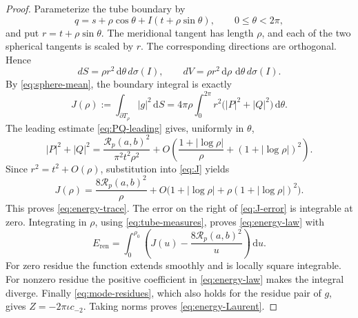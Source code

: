 \documentclass[11pt,a4paper]{article}
\numberwithin{equation}{section}
\theoremstyle{definition}
\theoremstyle{remark}
\newcommand{\dd}{\,\mathrm d}
\begin{document}
\begin{proof}
Parameterize the tube boundary by
\[
 q=s+\rho\cos\theta+I(t+\rho\sin\theta),
 \qquad 0\le\theta<2\pi,
\]
and put $r=t+\rho\sin\theta$. The meridional tangent has length
$\rho$, and each of the two spherical tangents is scaled by $r$.
The corresponding directions are orthogonal. Hence
\begin{equation}
 dS=\rho r^2\dd\theta\,d\sigma(I),\qquad
 dV=\rho r^2\dd\rho\,\dd\theta\,d\sigma(I).
 \label{eq:tube-measures}
\end{equation}
By \eqref{eq:sphere-mean}, the boundary integral is exactly
\begin{equation}
 J(\rho):=\int_{\partial T_\rho}|g|^2\dd S
 =4\pi\rho\int_0^{2\pi}r^2\bigl(|P|^2+|Q|^2\bigr)\dd\theta.
 \label{eq:J}
\end{equation}
The leading estimate \eqref{eq:PQ-leading} gives, uniformly in $\theta$,
\[
 |P|^2+|Q|^2
 =\frac{\mathcal R_p(a,b)^2}{\pi^2t^2\rho^2}
 +O\left(\frac{1+|\log\rho|}{\rho}
                  +(1+|\log\rho|)^2\right).
\]
Since $r^2=t^2+O(\rho)$, substitution into \eqref{eq:J} yields
\begin{equation}
 J(\rho)=\frac{8\mathcal R_p(a,b)^2}{\rho}
       +O\bigl(1+|\log\rho|+\rho(1+|\log\rho|)^2\bigr).
 \label{eq:J-error}
\end{equation}
This proves \eqref{eq:energy-trace}. The error on the right of
\eqref{eq:J-error} is integrable at zero. Integrating in $\rho$, using
\eqref{eq:tube-measures}, proves \eqref{eq:energy-law} with
\[
 E_{\mathrm{ren}}=
 \int_0^{\rho_0}\left(J(u)-\frac{8\mathcal R_p(a,b)^2}{u}\right)\dd u.
\]
For zero residue the function extends smoothly and is locally square
integrable. For nonzero residue the positive coefficient in
\eqref{eq:energy-law} makes the integral diverge.
Finally \eqref{eq:mode-residues}, which also holds for the residue pair
of $g$, gives $Z=-2\pi\iota c_{-2}$. Taking norms proves
\eqref{eq:energy-Laurent}.
\end{proof}
\end{document}
